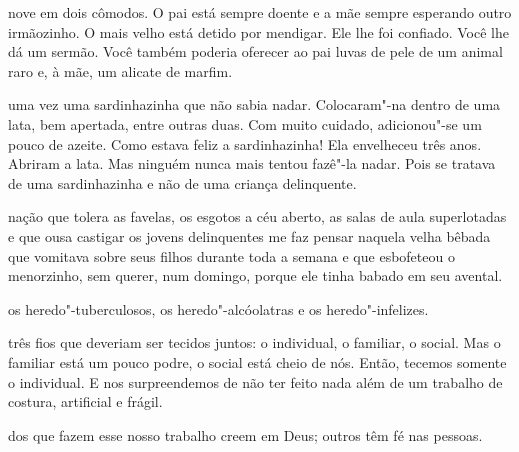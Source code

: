  nove em dois cômodos. O pai está sempre doente e a mãe sempre
esperando outro irmãozinho. O mais velho está detido por mendigar. Ele
lhe foi confiado. Você lhe dá um sermão. Você também poderia oferecer ao
pai luvas de pele de um animal raro e, à mãe, um alicate de marfim.



 uma vez uma sardinhazinha que não sabia nadar. Colocaram"-na dentro
de uma lata, bem apertada, entre outras duas. Com muito cuidado,
adicionou"-se um pouco de azeite. Como estava feliz a sardinhazinha! Ela
envelheceu três anos. Abriram a lata. Mas ninguém nunca mais tentou
fazê"-la nadar. Pois se tratava de uma sardinhazinha e não de uma criança
delinquente.



\pagebreak

 nação que tolera as favelas, os esgotos a céu aberto, as salas de
aula superlotadas e que ousa castigar os jovens delinquentes me faz
pensar naquela velha bêbada que vomitava sobre seus filhos durante toda
a semana e que esbofeteou o menorzinho, sem querer, num domingo, porque
ele tinha babado em seu avental.




 os heredo"-tuberculosos, os heredo"-alcóolatras e os heredo"-infelizes.




 três fios que deveriam ser tecidos juntos: o individual, o familiar,
o social. Mas o familiar está um pouco podre, o social está cheio de
nós. Então, tecemos somente o individual. E nos surpreendemos de não ter feito nada além de um trabalho de costura, artificial e frágil.



 dos que fazem esse nosso trabalho creem em Deus; outros têm fé
nas pessoas.



\pagebreak
\thispagestyle{empty}

